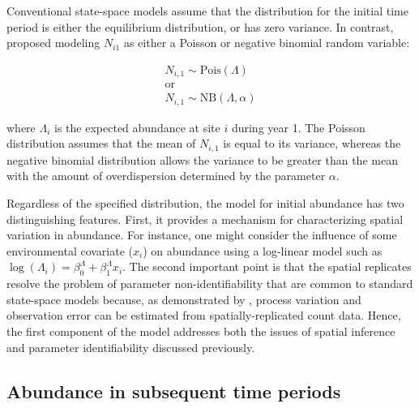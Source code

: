 \documentclass[12pt,english]{article}
\begin{document}
\begin{spacing}{1.9}
\begin{flushleft}
Conventional state-space models assume that the
distribution for the initial time period %
is either the equilibrium
distribution, or has zero variance.
In contrast, \citet{dail_madsen:2011} proposed modeling $N_{i1}$
as either a Poisson or negative binomial random variable:
\begin{linenomath*}
\begin{gather}
N_{i,1} \sim \mathrm{Pois}(\Lambda) \nonumber \\
\text{or} \nonumber \\
N_{i,1} \sim \mathrm{NB}(\Lambda, \alpha)
\label{eq:N1}
\end{gather}
\end{linenomath*}
where $\Lambda_i$ is the expected abundance at site $i$ during
year 1.
The Poisson distribution assumes that the mean of $N_{i,1}$ is
equal to its variance, whereas the negative binomial distribution allows the
variance to be greater than the mean with the amount of
overdispersion determined by the parameter $\alpha$.

Regardless of the specified distribution, the model for initial
abundance has two distinguishing features. First, it provides a
mechanism for characterizing spatial variation in abundance. For
instance, one might consider the influence of some environmental
covariate ($x_i$) on abundance using a log-linear
model such as $\log(\Lambda_i) = \beta^{\Lambda}_0 +
\beta^{\Lambda}_1
x_{i}$. The second important point is that the spatial
replicates resolve the
problem of parameter non-identifiability that are common to
standard state-space models because, as demonstrated by
\citet{royle:2004biom},
process variation and observation error can be estimated from
spatially-replicated count data. Hence, the first component of
the model addresses both the issues of spatial inference and
parameter identifiability discussed previously.

\subsection*{Abundance in subsequent time periods}


\end{flushleft}
\end{spacing}
\end{document}
